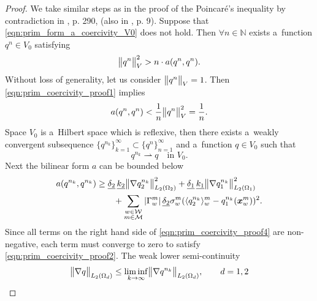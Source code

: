 \begin{proof}
We take similar steps as in the proof of the Poincar{\'e}'s inequality by contradiction in \cite{evans_partial_2010}, p. 290,
(also in \cite{necas_direct_2012}, p. 9).
Suppose that \eqref{eqn:prim_form_a_coercivity_V0} does not hold.
Then $\forall n\in\mathbb N$ exists a~function $q^n\in V_0$ satisfying
\begin{equation} \label{eqn:prim_coercivity_proof1}
    \bigl\Vert q^n\bigr\Vert^2_V > n\cdot a(q^n, q^n).
\end{equation}
Without loss of generality, let us consider $\bigl\Vert q^n\bigr\Vert_V=1$.
Then \eqref{eqn:prim_coercivity_proof1} implies 
\begin{equation} \label{eqn:prim_coercivity_proof2}
    a(q^{n}, q^{n}) < \frac{1}{n} \bigl\Vert q^{n}\bigr\Vert^2_V = \frac{1}{n}.
\end{equation}
Space $V_0$ is a~Hilbert space which is reflexive, then there exists a~weakly convergent subsequence
$\{q^{n_k}\}^{\infty}_{k=1}\subset\{q^{n}\}^{\infty}_{n=1}$ and a~function $q\in V_0$ such that
\begin{equation} \label{eqn:prim_coercivity_proof3}
    q^{n_k} \rightharpoonup q \quad \textrm{in } V_0.
\end{equation}
%
Next the bilinear form $a$ can be bounded below
\begin{align} 
    a(q^{n_k},q^{n_k}) &\geq
          \underline{\delta_2}\,\underline{k_2} \bigl\Vert\nabla q^{n_k}_2\bigr\Vert^2_{L_2(\Omega_2)}
        + \underline{\delta_1}\,\underline{k_1} \bigl\Vert\nabla q^{n_k}_1\bigr\Vert^2_{L_2(\Omega_1)} \nonumber\\
        & \qquad + \sum_{\substack{w\in \mathcal{W} \\ m\in \mathcal{M}}}\left|\Gamma^m_w\right| \underline{\delta_2}
            \sigma^m_w (\langle q^{n_k}_2\rangle^m_w - q^{n_k}_1(\mathbf{\boldsymbol{x}}^m_w))^2.  \label{eqn:prim_coercivity_proof4}
\end{align}
Since all terms on the right hand side of \eqref{eqn:prim_coercivity_proof4} are non-negative,
each term must converge to zero to satisfy \eqref{eqn:prim_coercivity_proof2}.
The weak lower semi-continuity
\begin{equation}
    \bigl\Vert\nabla q\bigr\Vert_{L_2(\Omega_d)} \leq \liminf \limits_{k \rightarrow \infty} \bigl\Vert\nabla q^{n_k}\bigr\Vert_{L_2(\Omega_d)}, \qquad d=1,2
\end{equation}

\end{proof}
